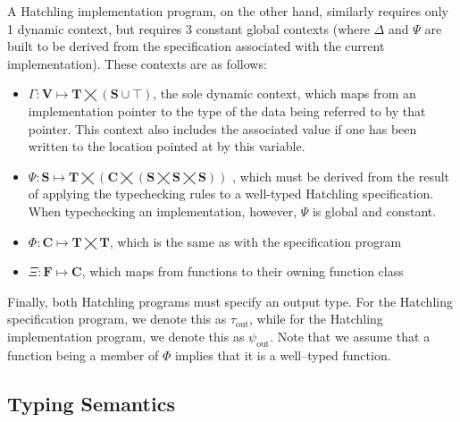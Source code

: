 A Hatchling implementation program, on the other hand, similarly requires only 1 dynamic context, but requires 3 constant global contexts (where $\Delta$ and $\Psi$ are built to be derived from the specification associated with the current implementation).  These contexts are as follows:
\begin{itemize}
\item $\Gamma:\mathbf{V}\mapsto\mathbf{T}\bigtimes\left(\mathbf{S}\cup\top\right)$, the sole dynamic context, which maps from an implementation pointer to the type of the data being referred to by that pointer.  This context also includes the associated value if one has been written to the location pointed at by this variable.
\item $\Psi:\mathbf{S}\mapsto
\mathbf{T}\bigtimes
\left(\mathbf{C}\bigtimes
\left(\mathbf{S}\bigtimes\mathbf{S}\bigtimes\mathbf{S}\right)
\right)$
, which must be derived from the result of applying the typechecking rules to a well-typed Hatchling specification.  When typechecking an implementation, however, $\Psi$ is global and constant.
\item $\Phi:\mathbf{C}\mapsto\mathbf{T}\bigtimes\mathbf{T}$, which is the same as with the specification program
\item $\Xi:\mathbf{F}\mapsto\mathbf{C}$, which maps from functions to their owning function class
\end{itemize}

Finally, both Hatchling programs must specify an output type.  For the Hatchling specification program, we denote this as $\tau_\textrm{out}$, while for the Hatchling implementation program, we denote this as $\psi_\textrm{out}$.  Note that we assume that a function being a member of $\Phi$ implies that it is a well--typed function.

\subsection{Typing Semantics}

